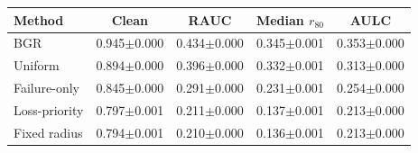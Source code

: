 \begin{tabular}{lcccc}
\hline
Method & Clean & RAUC & Median $r_{80}$ & AULC \\
\hline
BGR & 0.945$\pm$0.000 & 0.434$\pm$0.000 & 0.345$\pm$0.001 & 0.353$\pm$0.000 \\
Uniform & 0.894$\pm$0.000 & 0.396$\pm$0.000 & 0.332$\pm$0.001 & 0.313$\pm$0.000 \\
Failure-only & 0.845$\pm$0.000 & 0.291$\pm$0.000 & 0.231$\pm$0.001 & 0.254$\pm$0.000 \\
Loss-priority & 0.797$\pm$0.001 & 0.211$\pm$0.000 & 0.137$\pm$0.001 & 0.213$\pm$0.000 \\
Fixed radius & 0.794$\pm$0.001 & 0.210$\pm$0.000 & 0.136$\pm$0.001 & 0.213$\pm$0.000 \\
\hline
\end{tabular}
